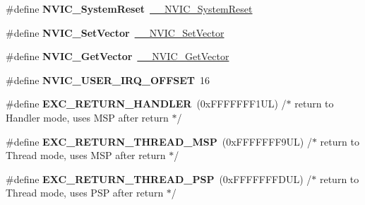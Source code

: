 \begin{DoxyCompactItemize}
\#define {\bfseries N\+V\+I\+C\+\_\+\+System\+Reset}~\mbox{\hyperlink{group___c_m_s_i_s___core___n_v_i_c_functions_ga0d9aa2d30fa54b41eb780c16e35b676c}{\+\_\+\+\_\+\+N\+V\+I\+C\+\_\+\+System\+Reset}}
\item 
\mbox{\label{group___c_m_s_i_s___core___n_v_i_c_functions_ga804af63bb4c4c317387897431814775d}} 
\#define {\bfseries N\+V\+I\+C\+\_\+\+Set\+Vector}~\mbox{\hyperlink{group___c_m_s_i_s___core___n_v_i_c_functions_ga0df355460bc1783d58f9d72ee4884208}{\+\_\+\+\_\+\+N\+V\+I\+C\+\_\+\+Set\+Vector}}
\item 
\mbox{\label{group___c_m_s_i_s___core___n_v_i_c_functions_ga955eb1c33a3dcc62af11a8385e8c0fc8}} 
\#define {\bfseries N\+V\+I\+C\+\_\+\+Get\+Vector}~\mbox{\hyperlink{group___c_m_s_i_s___core___n_v_i_c_functions_ga44b665d2afb708121d9b10c76ff00ee5}{\+\_\+\+\_\+\+N\+V\+I\+C\+\_\+\+Get\+Vector}}
\item 
\mbox{\label{group___c_m_s_i_s___core___n_v_i_c_functions_ga8045d905a5ca57437d8e6f71ffcb6df5}} 
\#define {\bfseries N\+V\+I\+C\+\_\+\+U\+S\+E\+R\+\_\+\+I\+R\+Q\+\_\+\+O\+F\+F\+S\+ET}~16
\item 
\mbox{\label{group___c_m_s_i_s___core___n_v_i_c_functions_gaa6fa2b10f756385433e08522d9e4632f}} 
\#define {\bfseries E\+X\+C\+\_\+\+R\+E\+T\+U\+R\+N\+\_\+\+H\+A\+N\+D\+L\+ER}~(0x\+F\+F\+F\+F\+F\+F\+F1\+U\+L)     /$\ast$ return to Handler mode, uses M\+S\+P after return                               $\ast$/
\item 
\mbox{\label{group___c_m_s_i_s___core___n_v_i_c_functions_gaea4703101b5e679f695e231f7ee72331}} 
\#define {\bfseries E\+X\+C\+\_\+\+R\+E\+T\+U\+R\+N\+\_\+\+T\+H\+R\+E\+A\+D\+\_\+\+M\+SP}~(0x\+F\+F\+F\+F\+F\+F\+F9\+U\+L)     /$\ast$ return to Thread mode, uses M\+S\+P after return                                $\ast$/
\item 
\mbox{\label{group___c_m_s_i_s___core___n_v_i_c_functions_ga9998daf0fbdf31dbc8f81cd604b58175}} 
\#define {\bfseries E\+X\+C\+\_\+\+R\+E\+T\+U\+R\+N\+\_\+\+T\+H\+R\+E\+A\+D\+\_\+\+P\+SP}~(0x\+F\+F\+F\+F\+F\+F\+F\+D\+U\+L)     /$\ast$ return to Thread mode, uses P\+S\+P after return                                $\ast$/
\end{DoxyCompactItemize}
